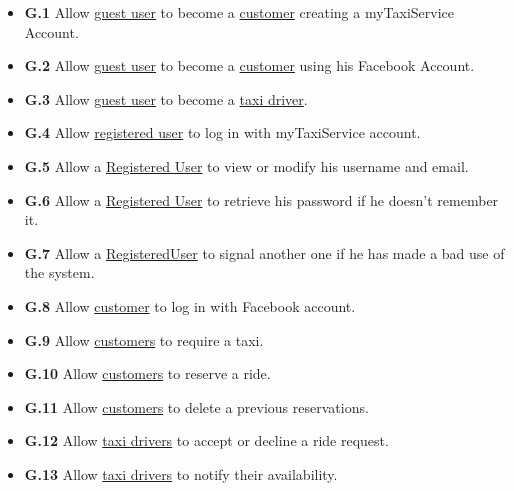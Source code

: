 \documentclass{report}
\begin{document}
		\begin{itemize}
			\item \textbf{\lbrack G.1\rbrack}\label{sec:g1} Allow \hyperref[sec:normaluser]{guest user} to become a \hyperref[sec:customer]{customer} creating a myTaxiService Account.

			\item \textbf{\lbrack G.2\rbrack}\label{sec:g2} Allow \hyperref[sec:normaluser]{guest user} to become a \hyperref[sec:customer]{customer} using his Facebook Account.

			\item \textbf{\lbrack G.3\rbrack}\label{sec:g3} Allow \hyperref[sec:normaluser]{guest user} to become a \hyperref[sec:tdriver]{taxi driver}.

			\item \textbf{\lbrack G.4\rbrack}\label{sec:g4} Allow \hyperref[sec:ruser]{registered user} to log in with myTaxiService account.

			\item \textbf{\lbrack G.5\rbrack}\label{sec:g5} Allow a \hyperref[sec:normaluser]{Registered User} to view or modify his username and email.

			\item \textbf{\lbrack G.6\rbrack}\label{sec:g6} Allow a \hyperref[sec:normaluser]{Registered User} to retrieve his password if he doesn't remember it.

			\item \textbf{\lbrack G.7\rbrack}\label{sec:g7} Allow a \hyperref[sec:normaluser]{RegisteredUser} to signal another one if he has made a bad use of the system.

			\item \textbf{\lbrack G.8\rbrack}\label{sec:g8} Allow \hyperref[sec:customer]{customer} to log in with Facebook account.

			\item \textbf{\lbrack G.9\rbrack}\label{sec:g9} Allow \hyperref[sec:customer]{customers} to require a taxi.

			\item \textbf{\lbrack G.10\rbrack}\label{sec:g10} Allow \hyperref[sec:customer]{customers} to reserve a ride.

			\item \textbf{\lbrack G.11\rbrack}\label{sec:g11} Allow \hyperref[sec:customer]{customers} to delete a previous reservations.

			\item \textbf{\lbrack G.12\rbrack}\label{sec:g12} Allow \hyperref[sec:tdriver]{taxi drivers} to accept or decline a ride request.

			\item \textbf{\lbrack G.13\rbrack}\label{sec:g13} Allow \hyperref[sec:tdriver]{taxi drivers} to notify their availability.
		\end{itemize}
		
\end{document}
